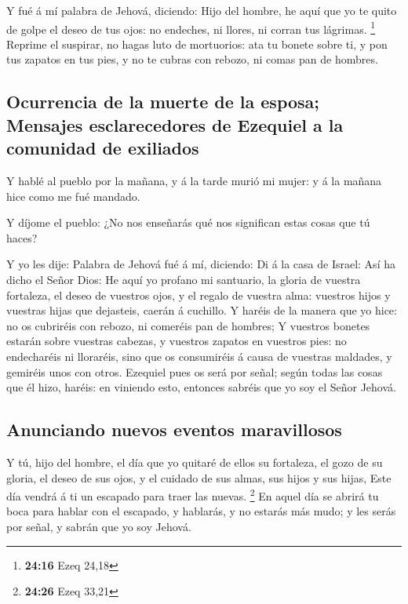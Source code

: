  Y fué á mí palabra de Jehová, diciendo: 
Hijo del hombre, he aquí que yo te quito de golpe el deseo de tus ojos:
no endeches, ni llores, ni corran tus lágrimas. \footnote{\textbf{24:16}
  Ezeq 24,18}  Reprime el suspirar, no hagas luto de
mortuorios: ata tu bonete sobre ti, y pon tus zapatos en tus pies, y no
te cubras con rebozo, ni comas pan de hombres.

\hypertarget{ocurrencia-de-la-muerte-de-la-esposa-mensajes-esclarecedores-de-ezequiel-a-la-comunidad-de-exiliados}{%
\subsection{Ocurrencia de la muerte de la esposa; Mensajes
esclarecedores de Ezequiel a la comunidad de
exiliados}\label{ocurrencia-de-la-muerte-de-la-esposa-mensajes-esclarecedores-de-ezequiel-a-la-comunidad-de-exiliados}}

 Y hablé al pueblo por la mañana, y á la tarde murió mi
mujer: y á la mañana hice como me fué mandado.

 Y díjome el pueblo: ¿No nos enseñarás qué nos significan
estas cosas que tú haces?

 Y yo les dije: Palabra de Jehová fué á mí, diciendo:
 Di á la casa de Israel: Así ha dicho el Señor Dios: He
aquí yo profano mi santuario, la gloria de vuestra fortaleza, el deseo
de vuestros ojos, y el regalo de vuestra alma: vuestros hijos y vuestras
hijas que dejasteis, caerán á cuchillo.  Y haréis de la
manera que yo hice: no os cubriréis con rebozo, ni comeréis pan de
hombres;  Y vuestros bonetes estarán sobre vuestras
cabezas, y vuestros zapatos en vuestros pies: no endecharéis ni
lloraréis, sino que os consumiréis á causa de vuestras maldades, y
gemiréis unos con otros.  Ezequiel pues os será por
señal; según todas las cosas que él hizo, haréis: en viniendo esto,
entonces sabréis que yo soy el Señor Jehová.

\hypertarget{anunciando-nuevos-eventos-maravillosos}{%
\subsection{Anunciando nuevos eventos
maravillosos}\label{anunciando-nuevos-eventos-maravillosos}}

 Y tú, hijo del hombre, el día que yo quitaré de ellos su
fortaleza, el gozo de su gloria, el deseo de sus ojos, y el cuidado de
sus almas, sus hijos y sus hijas,  Este día vendrá á ti
un escapado para traer las nuevas. \footnote{\textbf{24:26} Ezeq 33,21}
 En aquel día se abrirá tu boca para hablar con el
escapado, y hablarás, y no estarás más mudo; y les serás por señal, y
sabrán que yo soy Jehová.

